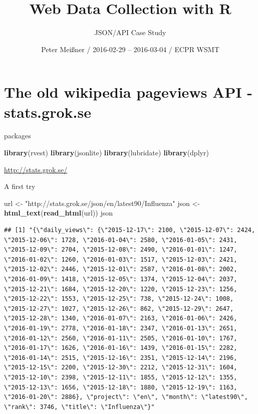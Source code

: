 \documentclass[ignorenonframetext,]{beamer}
\title{Web Data Collection with R}
\subtitle{JSON/API Case Study}
\author{Peter Meißner / 2016-02-29 -- 2016-03-04 / ECPR WSMT}
\date{}
\newenvironment{Shaded}{\begin{snugshade}}{\end{snugshade}}
\newcommand{\KeywordTok}[1]{\textcolor[rgb]{0.13,0.29,0.53}{\textbf{{#1}}}}
\newcommand{\StringTok}[1]{\textcolor[rgb]{0.31,0.60,0.02}{{#1}}}
\newcommand{\NormalTok}[1]{{#1}}
\begin{document}
\frame{\titlepage}

\begin{frame}
\tableofcontents[hideallsubsections]
\end{frame}

\section{The old wikipedia pageviews API -
stats.grok.se}\label{the-old-wikipedia-pageviews-api---stats.grok.se}

\begin{frame}[fragile]{packages}

\begin{Shaded}
\begin{Highlighting}[]
\KeywordTok{library}\NormalTok{(rvest)}
\KeywordTok{library}\NormalTok{(jsonlite)}
\KeywordTok{library}\NormalTok{(lubridate)}
\KeywordTok{library}\NormalTok{(dplyr)}
\end{Highlighting}
\end{Shaded}

\url{http://stats.grok.se/}

\end{frame}

\begin{frame}[fragile]{A first try}

\begin{Shaded}
\begin{Highlighting}[]
\NormalTok{url  <-}\StringTok{ "http://stats.grok.se/json/en/latest90/Influenza"}
\NormalTok{json <-}\StringTok{ }\KeywordTok{html_text}\NormalTok{(}\KeywordTok{read_html}\NormalTok{(url)) }
\NormalTok{json}
\end{Highlighting}
\end{Shaded}

\begin{verbatim}
## [1] "{\"daily_views\": {\"2015-12-17\": 2100, \"2015-12-07\": 2424, \"2015-12-06\": 1728, \"2016-01-04\": 2580, \"2016-01-05\": 2431, \"2015-12-09\": 2704, \"2015-12-08\": 2490, \"2016-01-01\": 1247, \"2016-01-02\": 1260, \"2016-01-03\": 1517, \"2015-12-03\": 2421, \"2015-12-02\": 2446, \"2015-12-01\": 2587, \"2016-01-08\": 2002, \"2016-01-09\": 1418, \"2015-12-05\": 1374, \"2015-12-04\": 2037, \"2015-12-21\": 1684, \"2015-12-20\": 1220, \"2015-12-23\": 1256, \"2015-12-22\": 1553, \"2015-12-25\": 738, \"2015-12-24\": 1008, \"2015-12-27\": 1027, \"2015-12-26\": 862, \"2015-12-29\": 2647, \"2015-12-28\": 1340, \"2016-01-07\": 2163, \"2016-01-06\": 2426, \"2016-01-19\": 2778, \"2016-01-18\": 2347, \"2016-01-13\": 2651, \"2016-01-12\": 2560, \"2016-01-11\": 2505, \"2016-01-10\": 1767, \"2016-01-17\": 1626, \"2016-01-16\": 1439, \"2016-01-15\": 2282, \"2016-01-14\": 2515, \"2015-12-16\": 2351, \"2015-12-14\": 2196, \"2015-12-15\": 2200, \"2015-12-30\": 2212, \"2015-12-31\": 1604, \"2015-12-10\": 2398, \"2015-12-11\": 1855, \"2015-12-12\": 1355, \"2015-12-13\": 1656, \"2015-12-18\": 1880, \"2015-12-19\": 1163, \"2016-01-20\": 2886}, \"project\": \"en\", \"month\": \"latest90\", \"rank\": 3746, \"title\": \"Influenza\"}"
\end{verbatim}

\end{frame}
\end{document}
